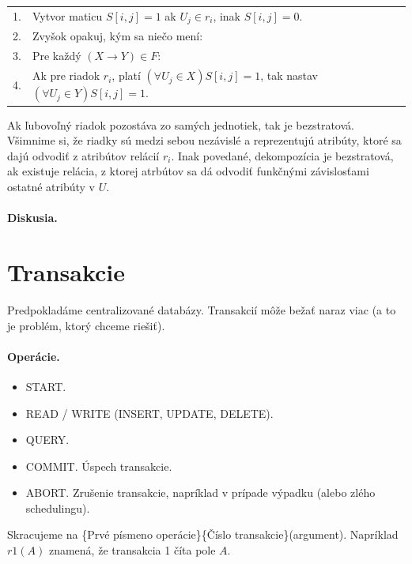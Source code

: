 \documentclass[10pt,a4paper]{article}
\begin{document}
\begin{tabular}{ll}
1. & Vytvor maticu $S[i,j] = 1$ ak $U_j \in r_i$, inak $S[i,j] = 0$.\\
2. & Zvyšok opakuj, kým sa niečo mení:\\
3. & Pre každý $(X \rightarrow Y) \in F$:\\
4. & Ak pre riadok $r_i$, platí $(\forall U_j \in X)S[i,j]=1$, tak nastav
     $(\forall U_j \in Y)S[i,j]=1$.\\
\end{tabular}

Ak ľubovoľný riadok pozostáva zo samých jednotiek, tak je bezstratová. Všimnime si, že riadky sú medzi sebou nezávislé a reprezentujú atribúty, ktoré sa dajú odvodiť z atribútov relácií $r_i$.
Inak povedané, dekompozícia je bezstratová, ak existuje relácia, z ktorej atrbútov sa dá odvodiť funkčnými závislosťami ostatné atribúty v $U$.

\paragraph{Diskusia.}

\section{Transakcie}

Predpokladáme centralizované databázy. Transakcií môže bežať naraz viac (a to je problém, ktorý chceme riešiť).

\paragraph{Operácie.}
\begin{itemize}
\item START.
\item READ / WRITE (INSERT, UPDATE, DELETE).
\item QUERY.
\item COMMIT. Úspech transakcie.
\item ABORT. Zrušenie transakcie, napríklad v prípade výpadku (alebo zlého schedulingu).
\end{itemize}

Skracujeme na \{Prvé písmeno operácie\}\{Číslo transakcie\}(argument). Napríklad $r1(A)$ znamená, že transakcia 1 číta pole $A$.
\end{document}
